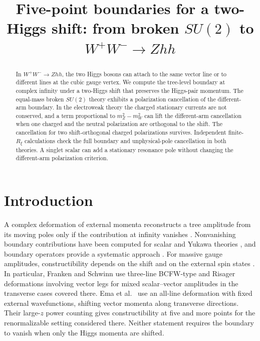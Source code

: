 \documentclass[11pt,a4paper]{article}
\title{Five-point boundaries for a two-Higgs shift: from broken \(SU(2)\) to \(W^+W^-\to Zhh\)}
\author{}
\date{}
\begin{document}
\begingroup
\renewcommand{\textasteriskcentered}{\ensuremath{*}}
\maketitle
\endgroup

\begin{abstract}
In \(W^+W^-\to Zhh\), the two Higgs bosons can attach to the same
vector line or to different lines at the cubic gauge vertex. We compute
the tree-level boundary at complex infinity under a two-Higgs shift
that preserves the Higgs-pair momentum. The equal-mass broken \(SU(2)\)
theory exhibits a polarization cancellation of the different-arm
boundary. In the electroweak theory the charged
stationary currents are not conserved, and a term proportional to
\(m_Z^2-m_W^2\) can lift the different-arm cancellation when one charged
and the neutral polarization are orthogonal to the shift. The
cancellation for two shift-orthogonal charged polarizations survives.
Independent finite-\(R_\xi\) calculations check the full boundary
and unphysical-pole cancellation in both theories. A singlet scalar
can add a stationary resonance pole without changing the
different-arm polarization criterion.
\end{abstract}

\section{Introduction}
A complex deformation of external momenta reconstructs a tree amplitude
from its moving poles only if the contribution at infinity vanishes
\cite{BCF,BCFW}. Nonvanishing boundary contributions have been
computed for scalar and Yukawa theories \cite{FengBoundary}, and
boundary operators provide a systematic approach \cite{Jin}.
For massive gauge amplitudes, constructibility depends on the shift
and on the external spin states \cite{BallavManna,EmaMomentum}.
In particular, Franken and Schwinn \cite[Sec.~5.3.3]{Franken}
use three-line BCFW-type and Risager deformations involving vector
legs for mixed scalar--vector amplitudes in the transverse cases
covered there. Ema et al.\ \cite[Sec.~2]{Ema} use an all-line
deformation with fixed external wavefunctions, shifting vector
momenta along transverse directions. Their large-\(z\) power
counting gives constructibility at five and more points for the
renormalizable setting considered there. Neither statement requires
the boundary to vanish when only the Higgs momenta are shifted.
\end{document}
